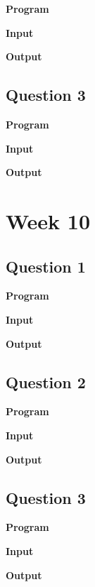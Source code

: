 \documentclass{article}
\begin{document}
\noindent \textbf{\large{Program}}

\newpage
\noindent \textbf{\large{Input}}

\noindent \textbf{\large{Output}}


\newpage
\subsection{Question 3}

\newline

\noindent \textbf{\large{Program}}

\newpage
\noindent \textbf{\large{Input}}

\noindent \textbf{\large{Output}}

\newpage
\section{Week 10}

\subsection{Question 1}

\newline

\noindent \textbf{\large{Program}}

\newpage
\noindent \textbf{\large{Input}}

\noindent \textbf{\large{Output}}


\newpage
\subsection{Question 2}

\newline

\noindent \textbf{\large{Program}}

\newpage
\noindent \textbf{\large{Input}}

\noindent \textbf{\large{Output}}


\newpage
\subsection{Question 3}

\newline

\noindent \textbf{\large{Program}}

\newpage
\noindent \textbf{\large{Input}}

\noindent \textbf{\large{Output}}

\newpage
\end{document}
